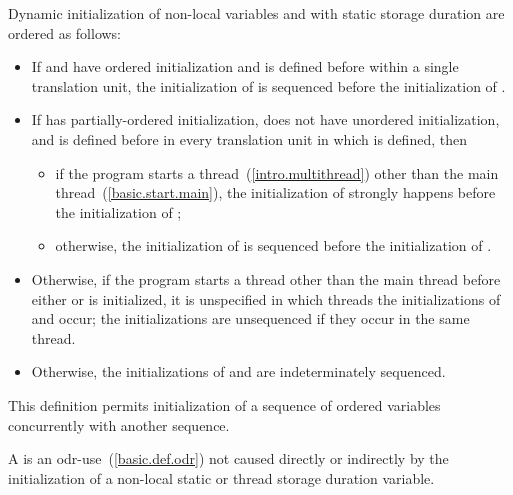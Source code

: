 \pnum
Dynamic initialization of non-local variables  and 
with static storage duration are ordered as follows:
\begin{itemize}
\item
If  and  have
ordered initialization and  is defined before  within
a single translation unit, the initialization of  is sequenced
before the initialization of .

\item
If  has partially-ordered initialization,  does not have
unordered initialization, and  is defined before  in
every translation unit in which  is defined, then
\begin{itemize}
\item
if the program starts a thread~(\ref{intro.multithread})
other than the main thread~(\ref{basic.start.main}),
the initialization of 
strongly happens before
the initialization of ;
\item
otherwise,
the initialization of 
is sequenced before
the initialization of .
\end{itemize}

\item
Otherwise, if the program starts a thread
other than the main thread
before either  or  is initialized,
it is unspecified in which threads
the initializations of  and  occur;
the initializations are unsequenced if they occur in the same thread.

\item
Otherwise, the initializations of  and  are indeterminately sequenced.
\end{itemize}
\begin{note}
This definition permits initialization of a sequence of
ordered variables concurrently with another sequence.
\end{note}

\pnum
{}%
A 
is an odr-use~(\ref{basic.def.odr}) not caused directly or indirectly by
the initialization of a non-local static or thread storage duration variable.


